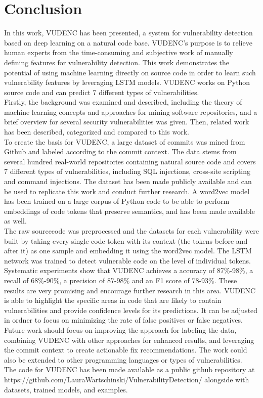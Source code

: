 \documentclass[
a4paper,
pagesize,
pdftex,
12pt,
twoside, %
BCOR=5mm, %
ngerman,
fleqn,
final,
]{scrartcl}
\begin{document}
	
	
	\newpage
	\setcounter{secnumdepth}{0} %
	\section{Conclusion}
	In this work, VUDENC has been presented, a system for vulnerability detection based on deep learning on a natural code base. VUDENC's purpose is to relieve human experts from the time-consuming and subjective work of manually defining features for vulnerability detection. This work demonstrates the potential of using machine learning directly on source code in order to learn such vulnerability features by leveraging LSTM models. VUDENC works on Python source code and can predict 7 different types of vulnerabilities.\\
	Firstly, the background was examined and described, including the theory of machine learning concepts and approaches for mining software repositories, and a brief overview for several security vulnerabilities was given. Then, related work has been described, categorized and compared to this work.\\
	To create the basis for VUDENC, a large dataset of commits was mined from Github and labeled according to the commit context. The data stems from several hundred real-world repositories containing natural source code and covers 7 different types of vulnerabilities, including SQL injections, cross-site scripting and command injections. The dataset has been made publicly available and can be used to replicate this work and conduct further research. A word2vec model has been trained on a large corpus of Python code to be able to perform embeddings of code tokens that preserve semantics, and has been made available as well.\\
	The raw sourcecode was preprocessed and the datasets for each vulnerability were built by taking every single code token with its context (the tokens before and after it) as one sample and embedding it using the word2vec model. The LSTM network was trained to detect vulnerable code on the level of individual tokens.\\
	Systematic experiments show that VUDENC achieves a accuracy of 87\%-98\%, a recall of 68\%-90\%, a precision of 87-98\% and an F1 score of 78-93\%.  These results are very promising and encourage further research in this area. VUDENC is able to highlight the specific areas in code that are likely to contain vulnerabilities and provide confidence levels for its predictions. It can be adjusted in ordner to focus on minimizing the rate of false positives or false negatives. \\
	Future work should focus on improving the approach for labeling the data, combining VUDENC with other approaches for enhanced results, and leveraging the commit context to create actionable fix recommendations. The work could also be extended to other programming languages or types of vulnerabilities.\\
	The code for VUDENC has been made available as a public github repository at https://github.com/LauraWartschinski/VulnerabilityDetection/ alongside with datasets, trained models, and examples.
		
\end{document}
